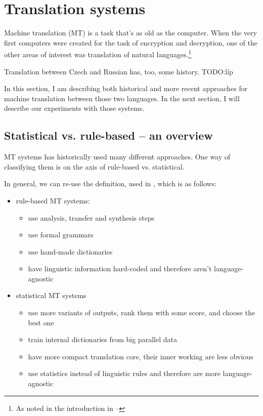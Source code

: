 \chapter{Translation systems}
Machine translation (MT) is a task that's as old as the computer. When the very first computers were created for the task of encryption and decryption, one of the other areas of interest was translation of natural languages.\footnote{As noted in the introduction in \cite{koehn2010statistical} -- }

Translation between Czech and Russian has, too, some history. TODO:líp

In this section, I am describing both historical and more recent approaches for machine translation between those two languages. In the next section, I will describe our experiments with those systems.

\section{Statistical vs. rule-based -- an overview}
\label{axis}
MT systems has historically used many different approaches. One way of classifying them is on the axis of rule-based vs. statistical.

In general, we can re-use the definition, used in \cite{bojar}, which is as follows:
\begin{itemize}
\item rule-based MT systems:
\begin{itemize}
\item use analysis, transfer and synthesis steps
\item use formal grammars
\item use hand-made dictionaries
\item have linguistic information hard-coded and therefore aren't lan\-guage-ag\-nos\-tic
\end{itemize}
\item statistical MT systems
\begin{itemize}
    \item use more variants of outputs, rank them with some score, and choose the best one
    \item train internal dictionaries from big parallel data
    \item have more compact translation core, their inner working are less obvious
    \item use statistics instead of linguistic rules and therefore are more language-agnostic
\end{itemize}
\end{itemize}

